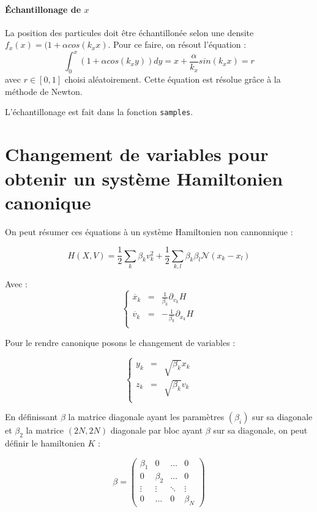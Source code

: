 \documentclass[a4paper,11pt]{article}
\newcommand{\Python}[1]{\texttt{#1}}
\begin{document}
\paragraph{Échantillonage de $x$}
La position des particules doit être échantillonée selon une densite $f_x(x) = ( 1 + \alpha cos(k_x x)$. Pour ce faire, on résout l'équation :
$$
\int_0^x (1 + \alpha cos(k_x y)) dy = x + \frac{\alpha}{k_x} sin(k_x x) = r
$$
avec $r \in [0, 1]$ choisi aléatoirement. Cette équation est résolue grâce à la méthode de Newton.

L'échantillonage est fait dans la fonction \Python{samples}.

\section{Changement de variables pour obtenir un système Hamiltonien canonique}

On peut résumer ces équations à un système Hamiltonien non cannonnique :

$$
H(X,V) = \frac{1}{2} \sum \limits_{k} \beta_k v_k^2 + \frac{1}{2} \sum \limits _{k, l} \beta_k \beta_l \mathcal{N}(x_k - x_l)
$$

Avec :
$$
\left\lbrace
\begin{array}{rcl}
	\dot{x_k} &=& \frac{1}{\beta_k} \partial_{v_k} H \\
	\dot{v_k} &=& - \frac{1}{\beta_k} \partial_{x_k} H \\

\end{array}
\right.
$$

Pour le rendre canonique posons le changement de variables : 

$$
\left\lbrace
\begin{array}{rcl}
	y_k &=& \sqrt{\beta_k} x_k \\
	z_k &=& \sqrt{\beta_k} v_k \\
\end{array}
\right.
$$

En définissant $\beta$ la matrice diagonale ayant les paramètres $(\beta_i)$ sur sa diagonale  et $\beta_2$ la matrice $(2N,2N)$ diagonale par bloc ayant $\beta$ sur sa diagonale, on peut définir le hamiltonien $K$ :

$$
\beta = \left( \begin{array}{cccc}
					\beta_1 & 0  &\dots & 0 \\
					0 & \beta_2  &\dots & 0 \\
					\vdots  & \vdots  & \ddots &\vdots  \\
					0 & \dots & 0 & \beta_N
\end{array} \right)
$$
\end{document}
